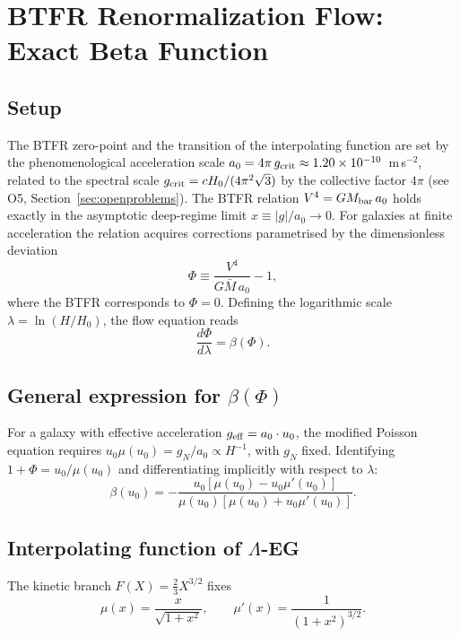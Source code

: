 \documentclass[11pt,a4paper]{article}
\begin{document}
\section{BTFR Renormalization Flow: Exact Beta Function}
\label{sec:betafunction}

\subsection{Setup}
The BTFR zero-point and the transition of the interpolating function are set by
the phenomenological acceleration scale $a_0 = 4\pi\,g_{\rm crit} \approx
1.20\times10^{-10}$~m\,s$^{-2}$, related to the spectral scale
$g_{\rm crit} = cH_0/(4\pi^2\sqrt{3})$ by the collective factor $4\pi$
(see O5, Section~\ref{sec:openproblems}).
The BTFR relation $V^4 = GM_{\rm bar}\,a_0$ holds exactly in the
asymptotic deep-regime limit $x\equiv|g|/a_0\to 0$.  For galaxies at
finite acceleration the relation acquires corrections parametrised by the
dimensionless deviation
\begin{equation}
  \Phi \equiv \frac{V^4}{G\bar{M}\,a_0} - 1,
\end{equation}
where the BTFR corresponds to $\Phi = 0$.  Defining the logarithmic scale
$\lambda = \ln(H/H_0)$, the flow equation reads
\begin{equation}
  \frac{d\Phi}{d\lambda} = \beta(\Phi).
\end{equation}

\subsection{General expression for $\beta(\Phi)$}
For a galaxy with effective acceleration $g_{\rm eff} = a_0\cdot u_0$,
the modified Poisson equation requires $u_0\mu(u_0) = g_N/a_0\propto H^{-1}$,
with $g_N$ fixed.  Identifying $1+\Phi = u_0/\mu(u_0)$ and differentiating
implicitly with respect to $\lambda$:
\begin{equation}
  \beta(u_0) = -\frac{u_0\!\left[\mu(u_0)-u_0\mu'(u_0)\right]}
                     {\mu(u_0)\!\left[\mu(u_0)+u_0\mu'(u_0)\right]}.
  \label{eq:beta_general}
\end{equation}

\subsection{Interpolating function of $\Lambda$-EG}
The kinetic branch $F(X)=\tfrac{2}{3}X^{3/2}$ fixes
\begin{equation}
  \mu(x) = \frac{x}{\sqrt{1+x^2}}, \qquad \mu'(x) = \frac{1}{(1+x^2)^{3/2}}.
\end{equation}
\end{document}
